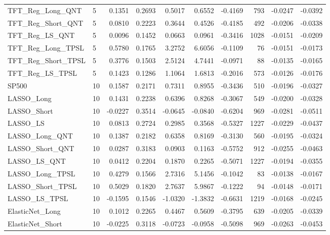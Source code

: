\begin{tabular}{llrrrrrrrr}
\cline{1-10}
TFT\_Reg\_Long\_QNT & 5 & 0.1351 & 0.2693 & 0.5017 & 0.6552 & -0.4169 & 793 & -0.0247 & -0.0392 \\
\cline{1-10}
TFT\_Reg\_Short\_QNT & 5 & 0.0810 & 0.2223 & 0.3644 & 0.4526 & -0.4185 & 492 & -0.0206 & -0.0338 \\
\cline{1-10}
TFT\_Reg\_LS\_QNT & 5 & 0.0096 & 0.1452 & 0.0663 & 0.0961 & -0.3416 & 1028 & -0.0151 & -0.0209 \\
\cline{1-10}
TFT\_Reg\_Long\_TPSL & 5 & 0.5780 & 0.1765 & 3.2752 & 6.6056 & -0.1109 & 76 & -0.0151 & -0.0173 \\
\cline{1-10}
TFT\_Reg\_Short\_TPSL & 5 & 0.3776 & 0.1503 & 2.5124 & 4.7441 & -0.0971 & 88 & -0.0135 & -0.0165 \\
\cline{1-10}
TFT\_Reg\_LS\_TPSL & 5 & 0.1423 & 0.1286 & 1.1064 & 1.6813 & -0.2016 & 573 & -0.0126 & -0.0176 \\
\cline{1-10}
SP500 & 10 & 0.1587 & 0.2171 & 0.7311 & 0.8955 & -0.3436 & 510 & -0.0196 & -0.0327 \\
\cline{1-10}
LASSO\_Long & 10 & 0.1431 & 0.2238 & 0.6396 & 0.8268 & -0.3067 & 549 & -0.0200 & -0.0328 \\
\cline{1-10}
LASSO\_Short & 10 & -0.0227 & 0.3514 & -0.0645 & -0.0840 & -0.6204 & 969 & -0.0281 & -0.0511 \\
\cline{1-10}
LASSO\_LS & 10 & 0.0813 & 0.2724 & 0.2985 & 0.3568 & -0.5327 & 1227 & -0.0229 & -0.0437 \\
\cline{1-10}
LASSO\_Long\_QNT & 10 & 0.1387 & 0.2182 & 0.6358 & 0.8169 & -0.3130 & 560 & -0.0195 & -0.0324 \\
\cline{1-10}
LASSO\_Short\_QNT & 10 & 0.0287 & 0.3183 & 0.0903 & 0.1163 & -0.5752 & 912 & -0.0255 & -0.0463 \\
\cline{1-10}
LASSO\_LS\_QNT & 10 & 0.0412 & 0.2204 & 0.1870 & 0.2265 & -0.5071 & 1227 & -0.0194 & -0.0355 \\
\cline{1-10}
LASSO\_Long\_TPSL & 10 & 0.4279 & 0.1566 & 2.7316 & 5.1456 & -0.1042 & 83 & -0.0138 & -0.0167 \\
\cline{1-10}
LASSO\_Short\_TPSL & 10 & 0.5029 & 0.1820 & 2.7637 & 5.9867 & -0.1222 & 94 & -0.0148 & -0.0171 \\
\cline{1-10}
LASSO\_LS\_TPSL & 10 & -0.1595 & 0.1546 & -1.0320 & -1.3832 & -0.6631 & 1219 & -0.0168 & -0.0245 \\
\cline{1-10}
ElasticNet\_Long & 10 & 0.1012 & 0.2265 & 0.4467 & 0.5609 & -0.3795 & 639 & -0.0205 & -0.0339 \\
\cline{1-10}
ElasticNet\_Short & 10 & -0.0225 & 0.3118 & -0.0723 & -0.0958 & -0.5098 & 969 & -0.0263 & -0.0453 \\

\end{tabular}
